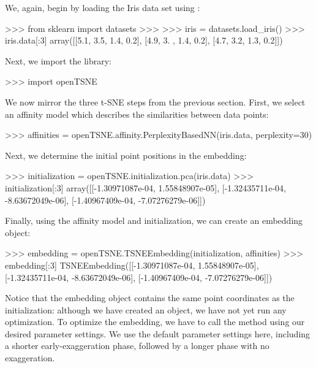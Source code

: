 \documentclass[article]{jss}
\newcommand{\opentsne}{\pkg{openTSNE}\xspace}
\begin{document}
We, again, begin by loading the Iris data set using :
\begin{CodeChunk}
\begin{CodeInput}
>>> from sklearn import datasets
>>>
>>> iris = datasets.load_iris()
>>> iris.data[:3]
array([[5.1, 3.5, 1.4, 0.2],
       [4.9, 3. , 1.4, 0.2],
       [4.7, 3.2, 1.3, 0.2]])
\end{CodeInput}
\end{CodeChunk}
Next, we import the \opentsne library:
\begin{CodeChunk}
\begin{CodeInput}
>>> import openTSNE
\end{CodeInput}
\end{CodeChunk}
We now mirror the three t-SNE steps from the previous section. First, we select an affinity model which describes the similarities between data points:
\begin{CodeChunk}
\begin{CodeInput}
>>> affinities = openTSNE.affinity.PerplexityBasedNN(iris.data, perplexity=30)
\end{CodeInput}
\end{CodeChunk}
Next, we determine the initial point positions in the embedding:
\begin{CodeChunk}
\begin{CodeInput}
>>> initialization = openTSNE.initialization.pca(iris.data)
>>> initialization[:3]
array([[-1.30971087e-04,  1.55848907e-05],
       [-1.32435711e-04, -8.63672049e-06],
       [-1.40967409e-04, -7.07276279e-06]])
\end{CodeInput}
\end{CodeChunk}
Finally, using the affinity model and initialization, we can create an embedding object:
\begin{CodeChunk}
\begin{CodeInput}
>>> embedding = openTSNE.TSNEEmbedding(initialization, affinities)
>>> embedding[:3]
TSNEEmbedding([[-1.30971087e-04,  1.55848907e-05],
               [-1.32435711e-04, -8.63672049e-06],
               [-1.40967409e-04, -7.07276279e-06]])
\end{CodeInput}
\end{CodeChunk}
Notice that the embedding object contains the same point coordinates as the initialization: although we have created an  object, we have not yet run any optimization. To optimize the embedding, we have to call the  method using our desired parameter settings. We use the default parameter settings here, including a shorter early-exaggeration phase, followed by a longer phase with no exaggeration.
\end{document}
